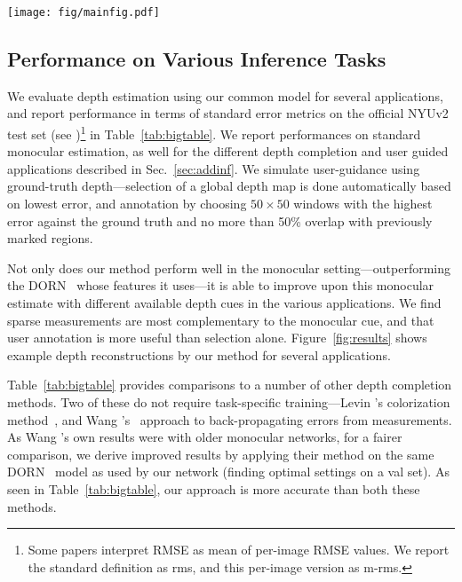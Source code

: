 \documentclass[10pt,twocolumn,letterpaper]{article}
\begin{document}
\begin{figure*}[t]
  \centering
  \texttt{[image: fig/mainfig.pdf]}
  \caption{Example depth estimates for different applications. We show outputs from our method for both the pure monocular setting, as well as the improved estimates we obtain combining our distributional output with additional depth information---such as different kinds of partial measurements, and user guidance with annotation and selection.}
  \label{fig:results}
\end{figure*}

\subsection{Performance on Various Inference Tasks}

We evaluate depth estimation using our common model for several applications, and report performance in terms of standard error metrics on the official NYUv2 test set (see \cite{eigen2015predicting})\footnote{Some papers interpret RMSE as mean of per-image RMSE values. We report the standard definition as rms, and this per-image version as m-rms.} in Table~\ref{tab:bigtable}. We report performances on standard monocular estimation, as well for the different depth completion and user guided applications described in Sec.~\ref{sec:addinf}. We simulate user-guidance using ground-truth depth---selection of a global depth map is done automatically based on lowest error, and annotation by choosing $50\times 50$ windows with the highest error against the ground truth and no more than 50\% overlap with previously marked regions.

Not only does our method perform well in the monocular setting---outperforming the DORN~\cite{fu2018deep} whose features it uses---it is able to improve upon this monocular estimate with different available depth cues in the various applications. We find sparse measurements are most complementary to the monocular cue, and that user annotation is more useful than selection alone. Figure~\ref{fig:results} shows example depth reconstructions by our method for several applications.

Table~\ref{tab:bigtable} provides comparisons to a number of other depth completion methods. Two of these do not require task-specific training---Levin \etal's colorization method~\cite{levin2004colorization}, and Wang \etal's~\cite{wang2019plug} approach to back-propagating errors from measurements. As Wang \etal's own results were with older monocular networks, for a fairer comparison, we derive improved results by applying their method on the same DORN~\cite{fu2018deep} model as used by our network (finding optimal settings on a val set). As seen in Table~\ref{tab:bigtable}, our approach is more accurate than both these methods.
\end{document}
